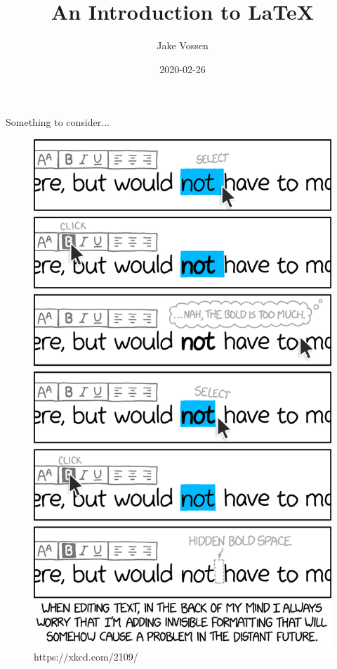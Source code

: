 \documentclass{beamer}
\title{An Introduction to \LaTeX}
\author{Jake Vossen}
\institute{Colorado School of Mines - ACM-W}
\date{2020-02-26}
\begin{document}
\begin{frame}{Something to consider...}
    \begin{figure}
    \includegraphics[scale=.13]{invisible_formatting_2x.png}
    \caption{https://xkcd.com/2109/}
  \end{figure}
\end{frame}
\begin{frame}
  \titlepage
\end{frame}

\end{document}
